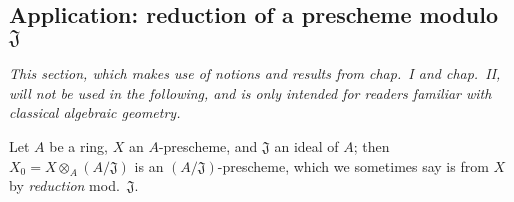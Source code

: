 \subsection{Application: reduction of a prescheme modulo $\mathfrak{J}$}

\emph{This section, which makes use of notions and results from chap.~I and chap.~II, will not be used in the following, and is only intended for readers familiar with classical algebraic geometry.}

\begin{env}[3.7.1]
\label{env-1.3.7.1}
Let $A$ be a ring, $X$ an $A$-prescheme, and $\mathfrak{J}$ an ideal of $A$; then $X_0=X\otimes_A(A/\mathfrak{J})$ is an $(A/\mathfrak{J})$-prescheme, which we sometimes say is  from $X$ by \emph{reduction} mod.~$\mathfrak{J}$.
\end{env}

